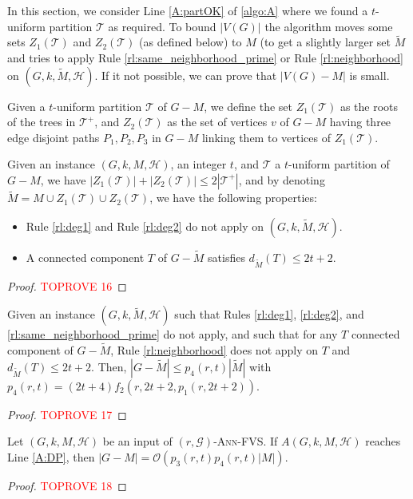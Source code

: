 \documentclass{amsart}
\newcommand{\G}{\mathcal{G}}
\newcommand{\mT}{\mathcal{T}}
\newcommand{\mH}{\mathcal{H}}
\newcommand{\AFVS}{\textsc{$(r,\G)$-Ann-FVS}\xspace}
\newcommand{\ruleref}[1]{\hyperref[#1]{\ref*{#1}}}
\renewcommand{\O}{\mathcal{O}}
\begin{document}
In this section, we consider Line \ref{A:partOK} of \autoref{algo:A} where we found a $t$-uniform partition $\mT$ as required. To bound $|V(G)|$ the algorithm moves some sets $Z_1(\mT)$ and $Z_2(\mT)$ (as defined below) to $M$ (to get a slightly larger set $\tilde{M}$ and tries to apply Rule \ruleref{rl:same_neighborhood_prime} or Rule \ruleref{rl:neighborhood} on $(G,k,\tilde{M},\mH)$.
If it not possible, we can prove that $|V(G)-M|$ is small.


\begin{definition}\label{def:Z}
    Given a $t$-uniform partition $\mT$ of $G-M$, we define the set $Z_1(\mT)$ as the roots of the trees in $\mT^+$, and $Z_2(\mT)$ as the set of vertices $v$ of $G - M$ having three edge disjoint paths $P_1,P_2,P_3$ in $G- M$ linking them to vertices of $Z_1(\mT)$.
\end{definition}

\begin{lemma}\label{lm:special}
    Given an instance $(G, k, M, \mH)$, an integer $t$, and $\mT$ a $t$-uniform partition of $G-M$, we have $|Z_1(\mT)|+|Z_2(\mT)|\leq 2|\mT^+|$, and by denoting $\tilde{M}=M\cup Z_1(\mT)\cup Z_2(\mT)$, we have the following properties:
    \begin{itemize}
        \item Rule \ruleref{rl:deg1} and Rule \ruleref{rl:deg2} do not apply on $(G,k,\tilde{M},\mH)$.
        \item A connected component $T$ of $G-\tilde{M}$ satisfies $d_{\tilde{M}}(T)\leq 2t+2$.
    \end{itemize}
\end{lemma}
\begin{proof}\textcolor{red}{TOPROVE 16}\end{proof}

\begin{lemma}\label{lm:finalR4R5}
    Given an instance $(G, k, \tilde{M}, \mH)$ such that Rules \ruleref{rl:deg1}, \ruleref{rl:deg2}, and \ruleref{rl:same_neighborhood_prime} do not apply, and such that for any $T$ connected component of $G-\tilde{M}$, Rule \ruleref{rl:neighborhood} does not apply on $T$ and $d_{\tilde{M}}(T)\leq 2t+2$. Then, $|G-\tilde{M}| \le p_4(r,t)|\tilde{M}|$ with $p_4(r,t)=(2t+4)f_2(r,2t+2,p_1(r,2t+2))$.
\end{lemma}
\begin{proof}\textcolor{red}{TOPROVE 17}\end{proof}

\begin{lemma}\label{lm:sizeGMinusM}
Let $(G,k,M,\mH)$ be an input of \AFVS.
If $A(G,k,M,\mH)$ reaches Line \ref{A:DP}, 
then $|G-M|=\O(p_3(r,t)p_4(r,t)|M|)$.
\end{lemma}
\begin{proof}\textcolor{red}{TOPROVE 18}\end{proof}
\end{document}
